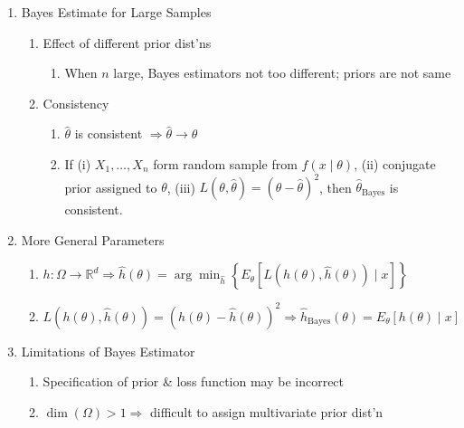 \documentclass[11pt]{article}
\begin{document}
\begin{enumerate}[label=\Roman*.]
\begin{enumerate}[label=\Alph*.]
  \end{enumerate}
  \item Bayes Estimate for Large Samples
  \begin{enumerate}[label=\Alph*.]
    \item Effect of different prior dist'ns
    \begin{enumerate}[label=\arabic*.]
      \item When $n$ large, Bayes estimators not too different; priors are not same
    \end{enumerate}
    \item Consistency
    \begin{enumerate}[label=\arabic*.]
      \item $\hat\theta$ is consistent $\Rightarrow \hat\theta\to\theta$
      \item If (i) $X_{1},\dots,X_{n}$ form random sample from $f(x\mid\theta)$, (ii) conjugate prior assigned to $\theta$, (iii) $L(\theta,\hat\theta)=(\theta-\hat\theta)^{2}$,
      then $\hat\theta_{\text{Bayes}}$ is consistent.
    \end{enumerate}
  \end{enumerate}
  \item More General Parameters
  \begin{enumerate}[label=\Alph*.]
    \item $h:\Omega\to\mathbb{R}^{d}\Rightarrow \hat h(\theta)=\arg\min_{\hat h}\left\{E_{\theta}\!\left[L(h(\theta),\hat h(\theta))\mid x\right]\right\}$
    \item $L(h(\theta),\hat h(\theta))=(h(\theta)-\hat h(\theta))^{2}\Rightarrow \hat h_{\text{Bayes}}(\theta)=E_{\theta}[h(\theta)\mid x]$
  \end{enumerate}
  \item Limitations of Bayes Estimator
  \begin{enumerate}[label=\Alph*.]
    \item Specification of prior \& loss function may be incorrect
    \item $\dim(\Omega)>1 \Rightarrow$ difficult to assign multivariate prior dist'n
  \end{enumerate}
\end{enumerate}
\end{document}
